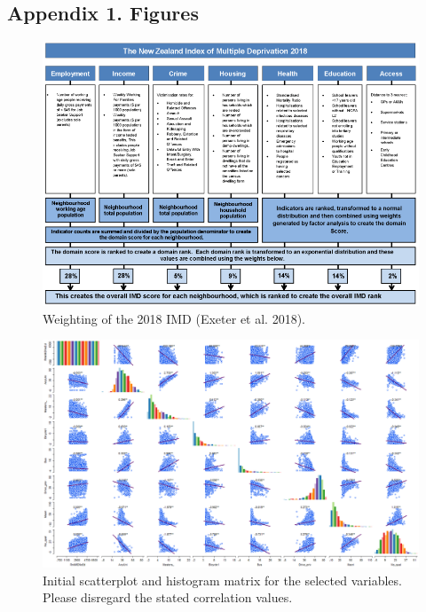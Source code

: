\documentclass[
  letterpaper,
  DIV=11,
  numbers=noendperiod,
  oneside]{scrartcl}
\begin{document}
\hypertarget{appendix-1.-figures}{%
\subsection{Appendix 1. Figures}\label{appendix-1.-figures}}

\begin{figure}

{\centering \includegraphics{final_pres_wrap/IMD_2018_development.png}

}

\caption{\label{fig-IMD}Weighting of the 2018 IMD (Exeter et al. 2018).}

\end{figure}

\begin{figure}

{\centering \includegraphics{scattermatrix_notransform.png}

}

\caption{\label{fig-notransform}Initial scatterplot and histogram matrix
for the selected variables. Please disregard the stated correlation
values.}

\end{figure}
\end{document}
